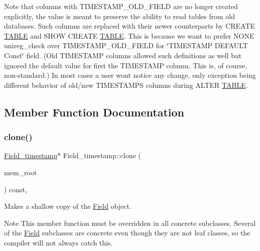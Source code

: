 Note that columns with T\+I\+M\+E\+S\+T\+A\+M\+P\+\_\+\+O\+L\+D\+\_\+\+F\+I\+E\+LD are no longer created explicitly, the value is meant to preserve the ability to read tables from old databases. Such columns are replaced with their newer counterparts by C\+R\+E\+A\+TE \mbox{\hyperlink{structTABLE}{T\+A\+B\+LE}} and S\+H\+OW C\+R\+E\+A\+TE \mbox{\hyperlink{structTABLE}{T\+A\+B\+LE}}. This is because we want to prefer N\+O\+NE unireg\+\_\+check over T\+I\+M\+E\+S\+T\+A\+M\+P\+\_\+\+O\+L\+D\+\_\+\+F\+I\+E\+LD for \char`\"{}\+T\+I\+M\+E\+S\+T\+A\+M\+P D\+E\+F\+A\+U\+L\+T \textquotesingle{}\+Const\textquotesingle{}\char`\"{} field. (Old T\+I\+M\+E\+S\+T\+A\+MP columns allowed such definitions as well but ignored the default value for first the T\+I\+M\+E\+S\+T\+A\+MP column. This is, of course, non-\/standard.) In most cases a user won\textquotesingle{}t notice any change, only exception being different behavior of old/new T\+I\+M\+E\+S\+T\+A\+M\+PS columns during A\+L\+T\+ER \mbox{\hyperlink{structTABLE}{T\+A\+B\+LE}}. 

\subsection{Member Function Documentation}
\mbox{\label{classField__timestamp_ae6d4c965003c05cb96f827c4d5d97ce7}} 
\subsubsection{\texorpdfstring{clone()}{clone()}\hspace{0.1cm}{\footnotesize\ttfamily [1/2]}}
{\footnotesize\ttfamily \mbox{\hyperlink{classField__timestamp}{Field\+\_\+timestamp}}$\ast$ Field\+\_\+timestamp\+::clone (\begin{DoxyParamCaption}\item[{M\+E\+M\+\_\+\+R\+O\+OT $\ast$}]{mem\+\_\+root }\end{DoxyParamCaption}) const\hspace{0.3cm}{\ttfamily [inline]}, {\ttfamily [virtual]}}

Makes a shallow copy of the \mbox{\hyperlink{classField}{Field}} object.

\begin{DoxyNote}{Note}
This member function must be overridden in all concrete subclasses. Several of the \mbox{\hyperlink{classField}{Field}} subclasses are concrete even though they are not leaf classes, so the compiler will not always catch this.
\end{DoxyNote}

